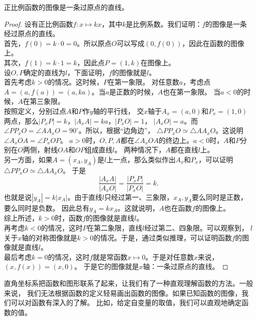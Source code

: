 \documentclass[12pt,UTF8,fontset=none]{ctexbook}
\begin{document}
\begin{tm}\label{tm:5-0-0}
    正比例函数的图像是一条过原点的直线。
\end{tm}
\begin{proof}
    设有正比例函数$f: x \mapsto kx$，其中$k$是比例系数。我们证明：$f$的图像是一条经过原点的直线。\\
    首先，$f(0) = k\cdot 0 = 0$。所以原点$O$可以写成$(0, f(0))$，因此在函数的图像上。\\
    其次，$f(1) = k\cdot 1 = k$，因此点$P = (1, k)$在图像上。\\
    设$O,P$确定的直线为$l$，下面证明，$f$的图像就是$l$。\\
    首先考虑$k > 0$的情况。这时候，$P$在第一象限。
    对任意数$a$，考虑点$A = (a, f(a)) = (a, ka)$。当$a$是正数的时候，$A$也在第一象限。
    当$a < 0$的时候，$A$在第三象限。\\
    按照定义，分别过点$A$和$P$作$y$轴的平行线，
    交$x$轴于$A_x = (a, 0)$和$P_x = (1, 0)$两点，那么$|P_xP| = k$，$|A_xA| = ka$，$|P_xO| = 1$，
    $|A_xO| = a$。而$\angle PP_xO = \angle AA_xO = 90^\circ$。所以，根据“边角边”，
    $\triangle PP_xO \simeq \triangle AA_xO$。这说明$\angle A_xOA = \angle P_xOP$。
    $a>0$时，$O,P,A$都在$\angle A_xOA$的终边上。$a<0$时，$A$和$P$分别在$O$两侧，射线$OA$和$OP$组成直线$l$。
    两种情况下，$A$都在直线$l$上。\\
    另一方面，如果$A = (x_A, y_A)$是$l$上一点，那么类似作出$A_x$和$P_x$，可以证明$\triangle PP_xO \simeq \triangle AA_xO$。
    于是
    $$ \frac{|A_xA|}{|A_xO|} = \frac{|P_xP|}{|P_xO|} = k.$$
    也就是说$|y_A| = k|x_A|$。由于直线$l$只经过第一、三象限，$x_A, y_A$要么同时是正数，要么同时是负数。
    因此总有$y_A = kx_A$。这就说明，$A$也在函数$f$的图像上。\\
    综上所述，$k>0$时，函数$f$的图像就是直线$l$。\\
    再考虑$k<0$的情况，这时$P$在第二象限，直线$l$经过第二、四象限。可以观察到，
    $l$关于$x$轴的对称图像就是$k>0$的情况。于是，通过类似推理，可以证明函数$f$的图像就是直线$l$。\\
    最后考虑$k=0$的情况，这时$f$就是常函数$x\mapsto 0$。于是对任意数$x$来说，$(x, f(x)) = (x, 0)$。
    于是它的图像就是$x$轴：一条过原点的直线。
\end{proof}

直角坐标系把函数和图形联系了起来，让我们有了一种直观理解函数的方法。一般来说，
我们无法根据函数的定义轻易画出函数的图像。如果已知函数的图像，我们可以对函数有深入的了解。
比如，给定自变量的取值，我们可以直观地确定函数的值。
\end{document}
